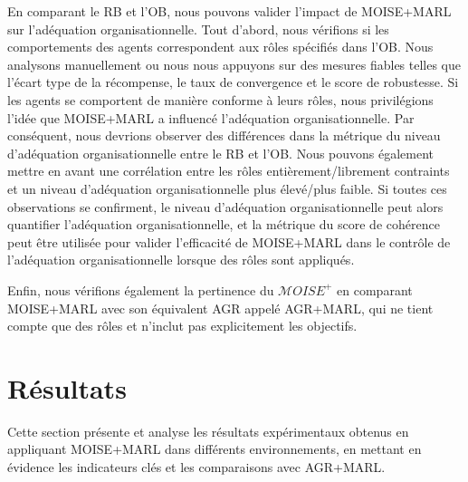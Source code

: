 En comparant le RB et l'OB, nous pouvons valider l'impact de MOISE+MARL sur l'adéquation organisationnelle. Tout d'abord, nous vérifions si les comportements des agents correspondent aux rôles spécifiés dans l'OB. Nous analysons manuellement ou nous nous appuyons sur des mesures fiables telles que l'écart type de la récompense, le taux de convergence et le score de robustesse. Si les agents se comportent de manière conforme à leurs rôles, nous privilégions l'idée que MOISE+MARL a influencé l'adéquation organisationnelle.
%
Par conséquent, nous devrions observer des différences dans la métrique du niveau d'adéquation organisationnelle entre le RB et l'OB. Nous pouvons également mettre en avant une corrélation entre les rôles entièrement/librement contraints et un niveau d'adéquation organisationnelle plus élevé/plus faible. Si toutes ces observations se confirment, le niveau d'adéquation organisationnelle peut alors quantifier l'adéquation organisationnelle, et la métrique du score de cohérence peut être utilisée pour valider l'efficacité de MOISE+MARL dans le contrôle de l'adéquation organisationnelle lorsque des rôles sont appliqués.

Enfin, nous vérifions également la pertinence du $\mathcal{M}OISE^+$ en comparant MOISE+MARL avec son équivalent AGR appelé AGR+MARL, qui ne tient compte que des rôles et  n'inclut pas explicitement les objectifs.

\section{Résultats}
\label{sec:results}

Cette section présente et analyse les résultats expérimentaux obtenus en appliquant MOISE+MARL dans différents environnements, en mettant en évidence les indicateurs clés et les comparaisons avec AGR+MARL.

